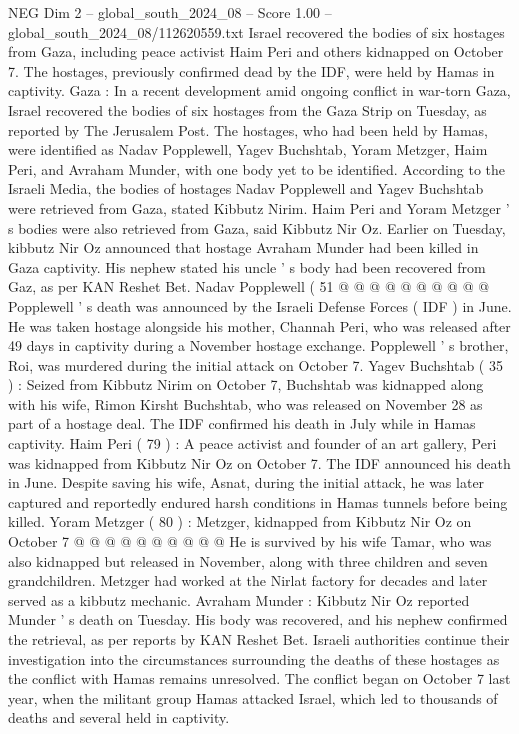 \begin{textsample}{NEG Dim 2 – global\_south\_2024\_08 – Score 1.00 – global\_south\_2024\_08/112620559.txt}  \label{ex:f2_neg_118}
Israel recovered the bodies of six hostages from Gaza, including peace activist Haim Peri and others kidnapped on October 7.
The hostages, previously confirmed dead by the IDF, were held by Hamas in captivity.
Gaza : In a recent development amid ongoing conflict in war-torn Gaza, Israel recovered the bodies of six hostages from the Gaza Strip on Tuesday, as reported by The Jerusalem Post.
The hostages, who had been held by Hamas, were identified as Nadav Popplewell, Yagev Buchshtab, Yoram Metzger, Haim Peri, and Avraham Munder, with one body yet to be identified.
According to the Israeli Media, the bodies of hostages Nadav Popplewell and Yagev Buchshtab were retrieved from Gaza, stated Kibbutz Nirim.
Haim Peri and Yoram Metzger ' s bodies were also retrieved from Gaza, said Kibbutz Nir Oz.
Earlier on Tuesday, kibbutz Nir Oz announced that hostage Avraham Munder had been killed in Gaza captivity.
His nephew stated his uncle ' s body had been recovered from Gaz, as per KAN Reshet Bet.
Nadav Popplewell ( 51 @ @ @ @ @ @ @ @ @ @ Popplewell ' s death was announced by the Israeli Defense Forces ( IDF ) in June.
He was taken hostage alongside his mother, Channah Peri, who was released after 49 days in captivity during a November hostage exchange.
Popplewell ' s brother, Roi, was murdered during the initial attack on October 7.
Yagev Buchshtab ( 35 ) : Seized from Kibbutz Nirim on October 7, Buchshtab was kidnapped along with his wife, Rimon Kirsht Buchshtab, who was released on November 28 as part of a hostage deal.
The IDF confirmed his death in July while in Hamas captivity.
Haim Peri ( 79 ) : A peace activist and founder of an art gallery, Peri was kidnapped from Kibbutz Nir Oz on October 7.
The IDF announced his death in June.
Despite saving his wife, Asnat, during the initial attack, he was later captured and reportedly endured harsh conditions in Hamas tunnels before being killed.
Yoram Metzger ( 80 ) : Metzger, kidnapped from Kibbutz Nir Oz on October 7 @ @ @ @ @ @ @ @ @ @ He is survived by his wife Tamar, who was also kidnapped but released in November, along with three children and seven grandchildren.
Metzger had worked at the Nirlat factory for decades and later served as a kibbutz mechanic.
Avraham Munder : Kibbutz Nir Oz reported Munder ' s death on Tuesday.
His body was recovered, and his nephew confirmed the retrieval, as per reports by KAN Reshet Bet.
Israeli authorities continue their investigation into the circumstances surrounding the deaths of these hostages as the conflict with Hamas remains unresolved.
The conflict began on October 7 last year, when the militant group Hamas attacked Israel, which led to thousands of deaths and several held in captivity.

\end{textsample}
